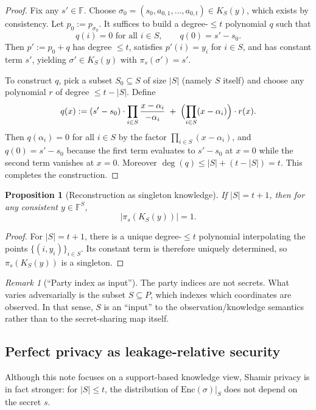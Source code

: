 \documentclass[11pt,a4paper]{article}
\newtheorem{proposition}[theorem]{Proposition}
\theoremstyle{definition}
\theoremstyle{remark}
\newtheorem{remark}[theorem]{Remark}
\newcommand{\Parties}{P}
\newcommand{\F}{\mathbb{F}}
\newcommand{\Enc}{\mathrm{Enc}}
\begin{document}
\begin{proof}
Fix any \(s'\in\F\). Choose \(\sigma_0=(s_0,a_{0,1},\dots,a_{0,t})\in K_S(y)\), which exists by consistency. Let \(p_0:=p_{\sigma_0}\). It suffices to build a degree-\(\le t\) polynomial \(q\) such that
\[
q(i)=0 \text{ for all } i\in S,
\qquad
q(0)=s'-s_0.
\]
Then \(p':=p_0+q\) has degree \(\le t\), satisfies \(p'(i)=y_i\) for \(i\in S\), and has constant term \(s'\), yielding \(\sigma'\in K_S(y)\) with \(\pi_s(\sigma')=s'\).

To construct \(q\), pick a subset \(S_0\subseteq S\) of size \(|S|\) (namely \(S\) itself) and choose any polynomial \(r\) of degree \(\le t-|S|\). Define
\[
q(x) := (s'-s_0)\cdot \prod_{i\in S} \frac{x-\alpha_i}{-\alpha_i}\; +\; \Bigl(\prod_{i\in S} (x-\alpha_i)\Bigr)\cdot r(x).
\]
Then \(q(\alpha_i)=0\) for all \(i\in S\) by the factor \(\prod_{i\in S}(x-\alpha_i)\), and \(q(0)=s'-s_0\) because the first term evaluates to \(s'-s_0\) at \(x=0\) while the second term vanishes at \(x=0\). Moreover \(\deg(q)\le |S| + (t-|S|)=t\). This completes the construction.
\end{proof}

\begin{proposition}[Reconstruction as singleton knowledge]
\label{prop:shamir-reconstruct}
If \(|S|=t+1\), then for any consistent \(y\in\F^S\),
\[
|\pi_s(K_S(y))| = 1.
\]
\end{proposition}

\begin{proof}
For \(|S|=t+1\), there is a unique degree-\(\le t\) polynomial interpolating the points \(\{(i,y_i)\}_{i\in S}\). Its constant term is therefore uniquely determined, so \(\pi_s(K_S(y))\) is a singleton.
\end{proof}

\begin{remark}[``Party index as input'']
The party indices are not secrets. What varies adversarially is the subset \(S\subseteq \Parties\), which indexes which coordinates are observed. In that sense, \(S\) is an ``input'' to the observation/knowledge semantics rather than to the secret-sharing map itself.
\end{remark}

\subsection{Perfect privacy as leakage-relative security}
Although this note focuses on a support-based knowledge view, Shamir privacy is in fact stronger: for \(|S|\le t\), the distribution of \(\Enc(\sigma)\vert_S\) does not depend on the secret \(s\).
\end{document}
